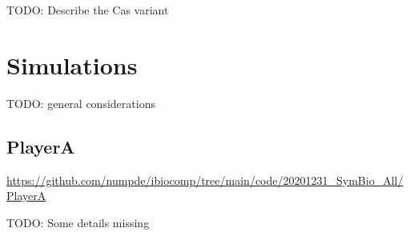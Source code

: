 \documentclass[12pt,notitlepage]{article}
\newcommand{\TODO}[1]{\textrm{\color{red}TODO: #1}}
\newcommand{\XOR}{\ensuremath{\mathop{\mathsf{xor}}}\xspace}
\newcommand{\hh}[1]{{\color{Purple}#1}}
\newcommand{\ra}[1]{{\color{Blue}#1}}
\begin{document}
\TODO{Describe the Cas variant}
	



%










%



\section{Simulations}

\TODO{general considerations}


\subsection{PlayerA} \label{s:sim:player}

\url{https://github.com/numpde/ibiocomp/tree/main/code/20201231_SymBio_All/PlayerA}

\TODO{Some details missing}




%
\end{document}
